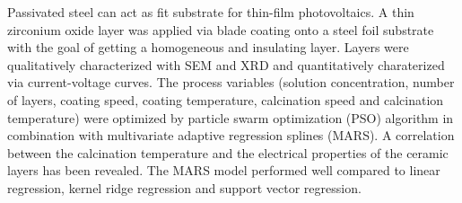 Passivated steel can act as fit substrate for thin-film photovoltaics.
A thin zirconium oxide layer was applied via blade coating onto a steel foil substrate with the goal of getting a homogeneous and insulating layer.
Layers were qualitatively characterized with SEM and XRD and quantitatively charaterized via current-voltage curves.
The process variables (solution concentration, number of layers, coating speed, coating temperature, calcination speed and calcination temperature) were optimized by particle swarm optimization (PSO) algorithm in combination with multivariate adaptive regression splines (MARS).
A correlation between the calcination temperature and the electrical properties of the ceramic layers has been revealed. 
The MARS model performed well compared to 
linear regression, kernel ridge regression and support vector regression.
